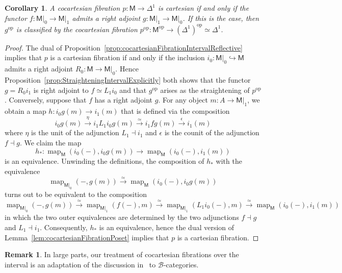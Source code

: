 \documentclass[reqno]{amsart}
\numberwithin{equation}{subsection}
\theoremstyle{plain}
\newtheorem{corollary}[equation]{Corollary}
\theoremstyle{definition}
\newtheorem{remark}[equation]{Remark}
\let\scr=\mathcal
\let\into=\hookrightarrow
\def\BB{\scr B}
\DeclareMathOperator{\Map}{map}
\newcommand{\op}{\mathrm{op}}
\newcommand{\map}[1]{\Map_{#1}}
\newcommand{\I}[1]{\mathsf{#1}}
\begin{document}
\begin{corollary}
	\label{cor:cartesianCocartesianFibrationInterval}
	A cocartesian fibration $p\colon \I{M}\to\Delta^1$ is cartesian if and only if the functor $f\colon\I{M}\vert_0\to\I{M}\vert_1$ admits a right adjoint $g\colon \I{M}\vert_1\to\I{M}\vert_0$. If this is the case, then $g^{\op}$ is classified by the cocartesian fibration $p^\op\colon\I{M}^\op\to (\Delta^1)^\op\simeq\Delta^1$.
\end{corollary}
\begin{proof}
	The dual of Proposition~\ref{prop:cocartesianFibrationIntervalReflective} implies that $p$ is a cartesian fibration if and only if the inclusion $i_0\colon\I{M}\vert_0\into\I{M}$ admits a right adjoint $R_0\colon\I{M}\to\I{M}\vert_0$. Hence Proposition~\ref{prop:StraighteningIntervalExplicitly} both shows that the functor $g=R_0i_1$ is right adjoint to $f\simeq L_1 i_0$ and that $g^\op$ arises as the straightening of $p^\op$. Conversely, suppose that $f$ has a right adjoint $g$. For any object $m\colon A\to\I{M}\vert_1$, we obtain a map $h\colon i_0 g(m)\to i_1(m)$ that is defined via the composition
	\begin{equation*}
	i_0g(m)\xrightarrow{\eta} i_1L_1 i_0g(m)\xrightarrow{\simeq} i_1 f g(m)\xrightarrow{\epsilon}i_1(m)
	\end{equation*}
	where $\eta$ is the unit of the adjunction $L_1\dashv i_1$ and $\epsilon$ is the counit of the adjunction $f\dashv g$. We claim the map
	\begin{equation*}
	h_\ast\colon \map{\I{M}}(i_0(-),i_0g(m))\to\map{\I{M}}(i_0(-),i_1(m))
	\end{equation*}
	is an equivalence. Unwinding the definitions, the composition of $h_\ast$ with the equivalence
	\begin{equation*}
	\map{\I{M}\vert_0}(-,g(m))\xrightarrow{\simeq} \map{\I{M}}(i_0(-),i_0g(m))
	\end{equation*}
	turns out to be equivalent to the composition
	\begin{equation*}
	\map{\I{M}\vert_0}(-,g(m))\xrightarrow{\simeq}\map{\I{M}\vert_1}(f(-), m)\xrightarrow{\simeq} \map{\I{M}\vert_1}(L_1 i_0(-), m)\xrightarrow{\simeq} \map{\I{M}}(i_0(-), i_1(m))
	\end{equation*}
	in which the two outer equivalences are determined by the two adjunctions $f\dashv g$ and $L_1\dashv i_1$.  Consequently, $h_\ast$ is an equivalence, hence the dual version of Lemma~\ref{lem:cocartesianFibrationPoset}  implies that $p$ is a cartesian fibration.
\end{proof}
\begin{remark}
	In large parts, our treatment of cocartesian fibrations over the interval is an adaptation of the discussion in~\cite[\href{https://kerodon.net/tag/02FJ}{\S~02FJ}]{kerodon} to $\BB$-categories.
\end{remark}
\end{document}
